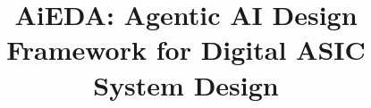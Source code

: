 \documentclass[conference]{IEEEtran}
\begin{document}
\title{AiEDA: Agentic AI Design Framework for Digital ASIC System Design}


\maketitle




%










\end{document}
